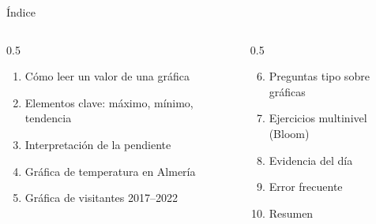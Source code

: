 \documentclass[aspectratio=169, 10pt, spanish]{beamer}
\begin{document}
\begin{frame}[plain]\titlepage\end{frame}

\begin{frame}{Índice}
  \begin{columns}[t]
    \begin{column}{0.5\textwidth}
      \begin{enumerate}
        \item Cómo leer un valor de una gráfica
        \item Elementos clave: máximo, mínimo, tendencia
        \item Interpretación de la pendiente
        \item Gráfica de temperatura en Almería
        \item Gráfica de visitantes 2017--2022
      \end{enumerate}
    \end{column}
    \begin{column}{0.5\textwidth}
      \begin{enumerate}\setcounter{enumi}{5}
        \item Preguntas tipo sobre gráficas
        \item Ejercicios multinivel (Bloom)
        \item Evidencia del día
        \item Error frecuente
        \item Resumen
      \end{enumerate}
    \end{column}
  \end{columns}
\end{frame}

\end{document}
